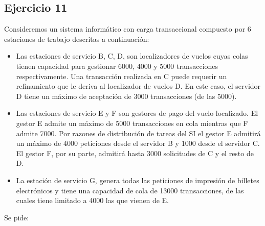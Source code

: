 \subsection{Ejercicio 11}
Consideremos  un  sistema  informático  con  carga  transaccional  compuesto  por  6  estaciones  de  trabajo descritas a continuación:
\begin{itemize}
    \item Las  estaciones  de  servicio  B,  C,  D,  son  localizadores  de  vuelos  cuyas  colas  tienen  capacidad  para gestionar 6000,  4000  y 5000  transacciones  respectivamente.  Una  transacción  realizada  en  C  puede requerir un refinamiento que le deriva al localizador de vuelos D. En este caso, el servidor D tiene un máximo de aceptación de 3000 transacciones (de las 5000).
    \item Las  estaciones  de  servicio  E  y  F  son  gestores  de  pago  del  vuelo  localizado.  El  gestor  E  admite  un máximo de 5000 transacciones en cola mientras que F admite 7000. Por razones de distribución de tareas del SI el gestor E admitirá un máximo de 4000 peticiones desde el servidor B y 1000 desde el servidor C. El gestor F, por su parte, admitirá hasta 3000 solicitudes de C y el resto de D.
    \item La  estación  de  servicio  G,  genera  todas  las  peticiones  de  impresión  de  billetes  electrónicos  y  tiene una capacidad de cola de 13000 transacciones, de las cuales tiene limitado a 4000 las que vienen de E.
\end{itemize}
Se pide:
